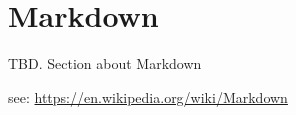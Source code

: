 \FILENAME

\section{Markdown}\label{markdown}

TBD. Section about Markdown

see: \url{https://en.wikipedia.org/wiki/Markdown}
